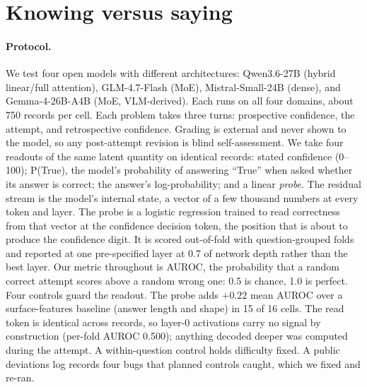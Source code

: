 \documentclass{article}
\begin{document}
\section{Knowing versus saying}
\label{sec:knowing}

\paragraph{Protocol.}
We test four open models with different architectures: Qwen3.6-27B (hybrid linear/full attention), GLM-4.7-Flash (MoE), Mistral-Small-24B (dense), and Gemma-4-26B-A4B (MoE, VLM-derived).
Each runs on all four domains, about 750 records per cell.
Each problem takes three turns: prospective confidence, the attempt, and retrospective confidence.
Grading is external and never shown to the model, so any post-attempt revision is blind self-assessment.
We take four readouts of the same latent quantity on identical records: stated confidence (0--100); P(True), the model's probability of answering ``True'' when asked whether its answer is correct; the answer's log-probability; and a linear \emph{probe}.
The residual stream is the model's internal state, a vector of a few thousand numbers at every token and layer.
The probe is a logistic regression trained to read correctness from that vector at the confidence decision token, the position that is about to produce the confidence digit.
It is scored out-of-fold with question-grouped folds and reported at one pre-specified layer at 0.7 of network depth rather than the best layer.
Our metric throughout is AUROC, the probability that a random correct attempt scores above a random wrong one: 0.5 is chance, 1.0 is perfect.
Four controls guard the readout.
The probe adds $+0.22$ mean AUROC over a surface-features baseline (answer length and shape) in 15 of 16 cells.
The read token is identical across records, so layer-0 activations carry no signal by construction (per-fold AUROC 0.500); anything decoded deeper was computed during the attempt.
A within-question control holds difficulty fixed.
A public deviations log records four bugs that planned controls caught, which we fixed and re-ran.
\end{document}
